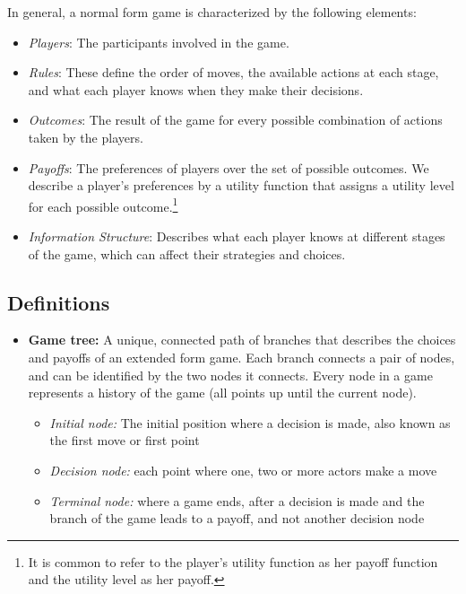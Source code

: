 \documentclass{article}
\begin{document}
In general, a normal form game is characterized by the following elements:
\begin{itemize}
    \item \textit{Players}: The participants involved in the game.
    \item \textit{Rules}: These define the order of moves, the available actions at each stage, and what each player knows when they make their decisions.
    \item \textit{Outcomes}: The result of the game for every possible combination of actions taken by the players.
    \item \textit{Payoffs}: The preferences of players over the set of possible outcomes. We describe a player’s preferences by a utility function that assigns a utility level for each possible outcome.\footnote{It is common to refer to the player’s utility function as her payoff function and the utility level as her payoff.}
    \item \textit{Information Structure}: Describes what each player knows at different stages of the game, which can affect their strategies and choices.
\end{itemize}


\subsection{Definitions}
\begin{itemize}
    \item \textbf{Game tree:} A unique, connected path of branches that describes the choices and payoffs of an extended form game. Each branch connects a pair of nodes, and can be identified by the two nodes it connects. Every node in a game represents a history of the game (all points up until the current node).
    \begin{itemize}
        \item \textit{Initial node:} The initial position where a decision is made, also known as the first move or first point
        \item \textit{Decision node:} each point where one, two or more actors make a move
        \item \textit{Terminal node:} where a game ends, after a decision is made and the branch of the game leads to a payoff, and not another decision node
    \end{itemize}
\end{itemize}
\end{document}
